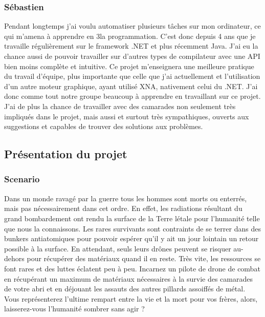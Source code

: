 ﻿\documentclass{article}
\begin{document}
\subsubsection{Sébastien }
Pendant longtemps j'ai voulu automatiser plusieurs tâches sur mon ordinateur, ce qui 
m'amena à apprendre en 3\ieme la programmation. C'est donc depuis 4 ans que je travaille 
régulièrement sur le framework .NET et plus récemment Java. 
J'ai eu la chance aussi de pouvoir travailler sur d'autres types de compilateur avec une API 
bien moins complète et intuitive. Ce projet m'enseignera une meilleure pratique du travail d'équipe, plus 
importante que celle que j'ai actuellement et l'utilisation d'un autre moteur graphique, ayant 
utilisé XNA, nativement celui du .NET. J'ai donc comme tout notre groupe beaucoup à 
apprendre en travaillant sur ce projet. 
J'ai de plus la chance de travailler avec des camarades non seulement très impliqués 
dans le projet, mais aussi et surtout très sympathiques, ouverts aux suggestions et capables de trouver 
des solutions aux problèmes.

\subsection{Présentation du projet}
\subsubsection{Scenario}
Dans un monde ravagé par la guerre tous les hommes sont morts ou enterrés, mais pas nécessairement dans cet ordre.
En effet, les radiations résultant du grand bombardement ont rendu la surface de la Terre létale pour l'humanité telle que nous 
la connaissons. 
Les rares survivants sont contraints de se terrer dans des bunkers antiatomiques pour pouvoir espérer qu'il y ait un jour lointain un retour possible à la surface. En attendant, seuls leurs drônes peuvent se risquer au-dehors pour récupérer des matériaux quand il en reste.
Très vite, les ressources se font rares et des luttes éclatent peu à peu.
Incarnez un pilote de drone de combat en récupérant un maximum de matériaux nécessaires à la survie des camarades de votre abri et en déjouant les assauts des autres
pillards assoiffés de métal. 
Vous représenterez l'ultime rempart entre la vie et la mort pour vos frères, alors, laisserez-vous l'humanité sombrer sans agir ?
\end{document}
